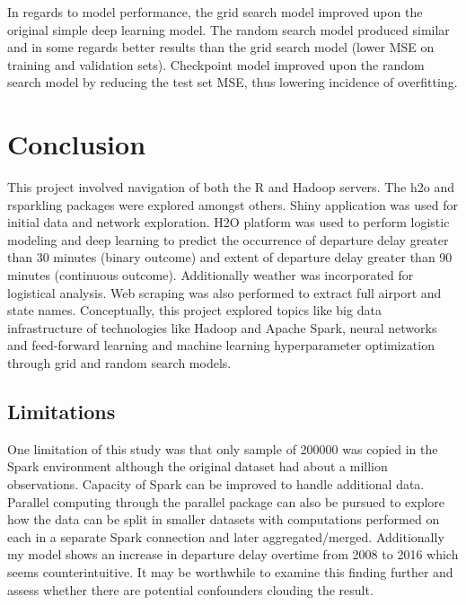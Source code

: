 \documentclass[12pt,twoside]{amherstthesis}
\begin{document}
  In regards to model performance, the grid search model improved upon the
  original simple deep learning model. The random search model produced
  similar and in some regards better results than the grid search model
  (lower MSE on training and validation sets). Checkpoint model improved
  upon the random search model by reducing the test set MSE, thus lowering
  incidence of overfitting.
  
  \chapter*{Conclusion}\label{conclusion-2}
  
  This project involved navigation of both the R and Hadoop servers. The
  h2o and rsparkling packages were explored amongst others. Shiny
  application was used for initial data and network exploration. H2O
  platform was used to perform logistic modeling and deep learning to
  predict the occurrence of departure delay greater than 30 minutes
  (binary outcome) and extent of departure delay greater than 90 minutes
  (continuous outcome). Additionally weather was incorporated for
  logistical analysis. Web scraping was also performed to extract full
  airport and state names. Conceptually, this project explored topics like
  big data infrastructure of technologies like Hadoop and Apache Spark,
  neural networks and feed-forward learning and machine learning
  hyperparameter optimization through grid and random search models.
  
  \section{Limitations}\label{limitations}
  
  One limitation of this study was that only sample of 200000 was copied
  in the Spark environment although the original dataset had about a
  million observations. Capacity of Spark can be improved to handle
  additional data. Parallel computing through the parallel package can
  also be pursued to explore how the data can be split in smaller datasets
  with computations performed on each in a separate Spark connection and
  later aggregated/merged. Additionally my model shows an increase in
  departure delay overtime from 2008 to 2016 which seems counterintuitive.
  It may be worthwhile to examine this finding further and assess whether
  there are potential confounders clouding the result.
  
\end{document}
